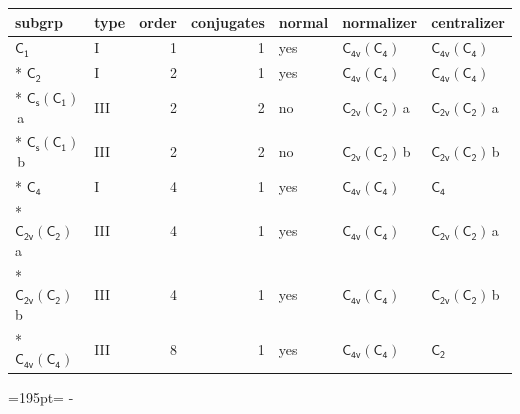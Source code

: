 \documentclass[10pt,a4paper]{article}
\newcommand{\needspace}[1]{\par\penalty-100\begingroup\dimen0=#1\relax\dimen2=\pagegoal
  \advance\dimen2-\pagetotal\ifdim\dimen0>\dimen2\relax\ifdim\dimen2>0pt\vfil\break\fi\fi
  \endgroup}
\numberwithin{equation}{section}
\newcommand{\grp}[1]{\mathsf{#1}}
\newcommand{\clsletter}[1]{\,{\scriptsize\color{black!55}#1}}
\begin{document}
{\small\begin{longtable}{@{}llrrlll@{}}\toprule
subgrp & type & order & conjugates & normal & normalizer & centralizer\\\midrule\endhead
\bottomrule\endfoot\endlastfoot
\href{../../../rotation/data/pdf/C1.pdf}{$\grp{C_{1}}$} & I & 1 & 1 & yes & \href{C4v-C4.pdf}{$\grp{C_{4v}}(\grp{C_{4}})$} & \href{C4v-C4.pdf}{$\grp{C_{4v}}(\grp{C_{4}})$}\\*
\href{../../../rotation/data/pdf/C2.pdf}{$\grp{C_{2}}$} & I & 2 & 1 & yes & \href{C4v-C4.pdf}{$\grp{C_{4v}}(\grp{C_{4}})$} & \href{C4v-C4.pdf}{$\grp{C_{4v}}(\grp{C_{4}})$}\\*
\href{C1v-C1.pdf}{$\grp{C_{s}}(\grp{C_{1}})$}\clsletter{a} & III & 2 & 2 & no & \href{C2v-C2.pdf}{$\grp{C_{2v}}(\grp{C_{2}})$}\clsletter{a} & \href{C2v-C2.pdf}{$\grp{C_{2v}}(\grp{C_{2}})$}\clsletter{a}\\*
\href{C1v-C1.pdf}{$\grp{C_{s}}(\grp{C_{1}})$}\clsletter{b} & III & 2 & 2 & no & \href{C2v-C2.pdf}{$\grp{C_{2v}}(\grp{C_{2}})$}\clsletter{b} & \href{C2v-C2.pdf}{$\grp{C_{2v}}(\grp{C_{2}})$}\clsletter{b}\\*
\href{../../../rotation/data/pdf/C4.pdf}{$\grp{C_{4}}$} & I & 4 & 1 & yes & \href{C4v-C4.pdf}{$\grp{C_{4v}}(\grp{C_{4}})$} & \href{../../../rotation/data/pdf/C4.pdf}{$\grp{C_{4}}$}\\*
\href{C2v-C2.pdf}{$\grp{C_{2v}}(\grp{C_{2}})$}\clsletter{a} & III & 4 & 1 & yes & \href{C4v-C4.pdf}{$\grp{C_{4v}}(\grp{C_{4}})$} & \href{C2v-C2.pdf}{$\grp{C_{2v}}(\grp{C_{2}})$}\clsletter{a}\\*
\href{C2v-C2.pdf}{$\grp{C_{2v}}(\grp{C_{2}})$}\clsletter{b} & III & 4 & 1 & yes & \href{C4v-C4.pdf}{$\grp{C_{4v}}(\grp{C_{4}})$} & \href{C2v-C2.pdf}{$\grp{C_{2v}}(\grp{C_{2}})$}\clsletter{b}\\*
\href{C4v-C4.pdf}{$\grp{C_{4v}}(\grp{C_{4}})$} & III & 8 & 1 & yes & \href{C4v-C4.pdf}{$\grp{C_{4v}}(\grp{C_{4}})$} & \href{../../../rotation/data/pdf/C2.pdf}{$\grp{C_{2}}$}\\
\bottomrule\end{longtable}}
\needspace{195pt}
\end{document}
